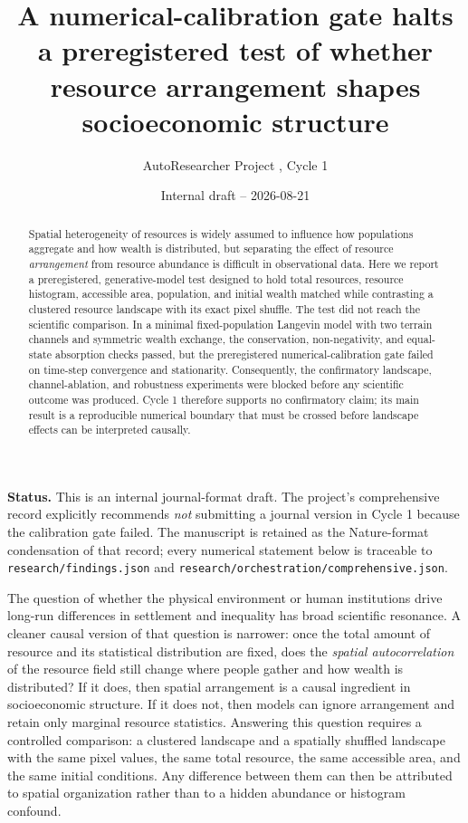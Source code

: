 \documentclass[11pt]{article}
\title{\bfseries A numerical-calibration gate halts a preregistered test of whether resource arrangement shapes socioeconomic structure}
\author{AutoResearcher Project \code{ar-politeia}, Cycle 1}
\date{Internal draft -- 2026-08-21}
\newcommand{\code}[1]{\texttt{#1}}
\begin{document}
\maketitle

\begin{abstract}
Spatial heterogeneity of resources is widely assumed to influence how populations
aggregate and how wealth is distributed, but separating the effect of resource
\emph{arrangement} from resource abundance is difficult in observational data.
Here we report a preregistered, generative-model test designed to hold total
resources, resource histogram, accessible area, population, and initial wealth
matched while contrasting a clustered resource landscape with its exact pixel
shuffle. The test did not reach the scientific comparison. In a minimal
fixed-population Langevin model with two terrain channels and symmetric wealth
exchange, the conservation, non-negativity, and equal-state absorption checks
passed, but the preregistered numerical-calibration gate failed on
time-step convergence and stationarity. Consequently, the confirmatory
landscape, channel-ablation, and robustness experiments were blocked before any
scientific outcome was produced. Cycle 1 therefore supports no confirmatory
claim; its main result is a reproducible numerical boundary that must be crossed
before landscape effects can be interpreted causally.
\end{abstract}

\vspace{1.4em}
\noindent\textbf{Status.} This is an internal journal-format draft. The
project's comprehensive record explicitly recommends \emph{not} submitting a
journal version in Cycle 1 because the calibration gate failed. The manuscript
is retained as the Nature-format condensation of that record; every numerical
statement below is traceable to \code{research/findings.json} and
\code{research/orchestration/comprehensive.json}.

\medskip
\noindent
The question of whether the physical environment or human institutions drive
long-run differences in settlement and inequality has broad scientific
resonance. A cleaner causal version of that question is narrower: once the
total amount of resource and its statistical distribution are fixed, does the
\emph{spatial autocorrelation} of the resource field still change where people
gather and how wealth is distributed? If it does, then spatial arrangement is a
causal ingredient in socioeconomic structure. If it does not, then models can
ignore arrangement and retain only marginal resource statistics. Answering this
question requires a controlled comparison: a clustered landscape and a
spatially shuffled landscape with the same pixel values, the same total
resource, the same accessible area, and the same initial conditions. Any
difference between them can then be attributed to spatial organization rather
than to a hidden abundance or histogram confound.
\end{document}
